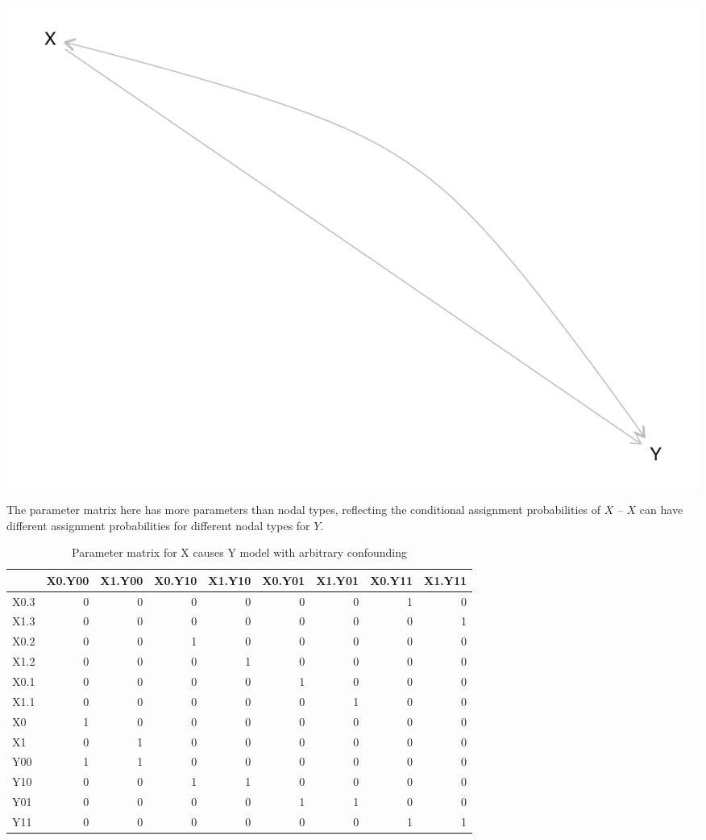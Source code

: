 \documentclass[12pt,]{book}
\begin{document}
\includegraphics{ii_files/figure-latex/unnamed-chunk-104-1.pdf}

The parameter matrix here has more parameters than nodal types, reflecting the conditional assignment probabilities of \(X\) -- \(X\) can have different assignment probabilities for different nodal types for \(Y\).

\begin{table}[t]

\caption{\label{tab:unnamed-chunk-106}Parameter matrix for X causes Y model with arbitrary confounding}
\centering
\begin{tabular}{l|r|r|r|r|r|r|r|r}
\hline
  & X0.Y00 & X1.Y00 & X0.Y10 & X1.Y10 & X0.Y01 & X1.Y01 & X0.Y11 & X1.Y11\\
\hline
X0.3 & 0 & 0 & 0 & 0 & 0 & 0 & 1 & 0\\
\hline
X1.3 & 0 & 0 & 0 & 0 & 0 & 0 & 0 & 1\\
\hline
X0.2 & 0 & 0 & 1 & 0 & 0 & 0 & 0 & 0\\
\hline
X1.2 & 0 & 0 & 0 & 1 & 0 & 0 & 0 & 0\\
\hline
X0.1 & 0 & 0 & 0 & 0 & 1 & 0 & 0 & 0\\
\hline
X1.1 & 0 & 0 & 0 & 0 & 0 & 1 & 0 & 0\\
\hline
X0 & 1 & 0 & 0 & 0 & 0 & 0 & 0 & 0\\
\hline
X1 & 0 & 1 & 0 & 0 & 0 & 0 & 0 & 0\\
\hline
Y00 & 1 & 1 & 0 & 0 & 0 & 0 & 0 & 0\\
\hline
Y10 & 0 & 0 & 1 & 1 & 0 & 0 & 0 & 0\\
\hline
Y01 & 0 & 0 & 0 & 0 & 1 & 1 & 0 & 0\\
\hline
Y11 & 0 & 0 & 0 & 0 & 0 & 0 & 1 & 1\\
\hline
\end{tabular}
\end{table}
\end{document}
